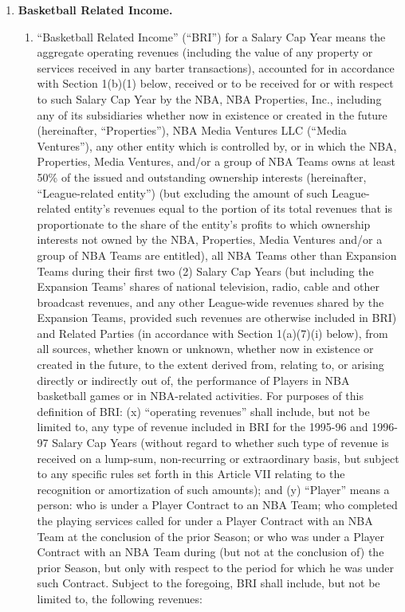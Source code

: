 \documentclass[
]{book}
\providecommand{\tightlist}{%
  \setlength{\itemsep}{0pt}\setlength{\parskip}{0pt}}
\begin{document}
\begin{enumerate}
\def\labelenumi{(\alph{enumi})}
\tightlist
\item
  \textbf{Basketball Related Income.}

  \begin{enumerate}
  \def\labelenumii{(\arabic{enumii})}
  \item
    ``Basketball Related Income'' (``BRI'') for a Salary Cap Year means the aggregate operating revenues (including the value of any property or services received in any barter transactions), accounted for in accordance with Section 1(b)(1) below, received or to be received for or with respect to such Salary Cap Year by the NBA, NBA Properties, Inc., including any of its subsidiaries whether now in existence or created in the future (hereinafter, ``Properties''), NBA Media Ventures LLC (``Media Ventures''), any other entity which is controlled by, or in which the NBA, Properties, Media Ventures, and/or a group of NBA Teams owns at least 50\% of the issued and outstanding ownership interests (hereinafter, ``League-related entity'') (but excluding the amount of such League-related entity's revenues equal to the portion of its total revenues that is proportionate to the share of the entity's profits to which ownership interests not owned by the NBA, Properties, Media Ventures and/or a group of NBA Teams are entitled), all NBA Teams other than Expansion Teams during their first two (2) Salary Cap Years (but including the Expansion Teams' shares of national television, radio, cable and other broadcast revenues, and any other League-wide revenues shared by the Expansion Teams, provided such revenues are otherwise included in BRI) and Related Parties (in accordance with Section 1(a)(7)(i) below), from all sources, whether known or unknown, whether now in existence or created in the future, to the extent derived from, relating to, or arising directly or indirectly out of, the performance of Players in NBA basketball games or in NBA-related activities. For purposes of this definition of BRI: (x) ``operating revenues'' shall include, but not be limited to, any type of revenue included in BRI for the 1995-96 and 1996-97 Salary Cap Years (without regard to whether such type of revenue is received on a lump-sum, non-recurring or extraordinary basis, but subject to any specific rules set forth in this Article VII relating to the recognition or amortization of such amounts); and (y) ``Player'' means a person: who is under a Player Contract to an NBA Team; who completed the playing services called for under a Player Contract with an NBA Team at the conclusion of the prior Season; or who was under a Player Contract with an NBA Team during (but not at the conclusion of) the prior Season, but only with respect to the period for which he was under such Contract. Subject to the foregoing, BRI shall include, but not be limited to, the following revenues:


\end{enumerate}
\end{enumerate}
\end{document}
